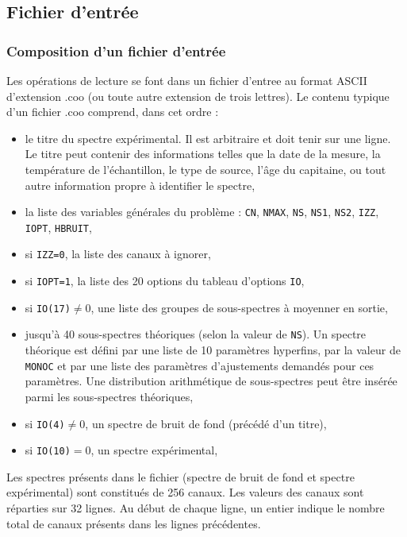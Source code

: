 \subsection{Fichier d'entrée}
\label{part:fichier_entree}
\subsubsection{Composition d'un fichier d'entrée}
Les opérations de lecture se font dans un fichier d'entree au format ASCII d'extension .coo (ou toute autre extension de trois lettres).
Le contenu typique d'un fichier .coo comprend, dans cet ordre :

\begin{itemize}
\item le titre du spectre expérimental. Il est arbitraire et doit tenir sur une ligne.
    Le titre peut contenir des informations telles que la date de la mesure, la température de l'échantillon, le type de source, l'âge du capitaine, ou tout autre information propre à identifier le spectre,
\item la liste des variables générales du problème : \lstinline{CN}, \lstinline{NMAX}, \lstinline{NS}, \lstinline{NS1}, \lstinline{NS2}, \lstinline{IZZ}, \lstinline{IOPT}, \lstinline{HBRUIT},
\item si \lstinline{IZZ=0}, la liste des canaux à ignorer,
\item si \lstinline{IOPT=1}, la liste des 20 options du tableau d'options \lstinline{IO},
\item si \lstinline{IO(17)}$\neq 0$, une liste des groupes de sous-spectres à moyenner en sortie,
\item jusqu'à 40 sous-spectres théoriques (selon la valeur de \lstinline{NS}).
Un spectre théorique est défini par une liste de 10 paramètres hyperfins, par la valeur de \lstinline{MONOC} et par une liste des paramètres d'ajustements demandés pour ces paramètres.
    Une distribution arithmétique de sous-spectres peut être insérée parmi les sous-spectres théoriques,
\item si \lstinline{IO(4)}$\neq 0 $, un spectre de bruit de fond (précédé d'un titre),
\item si \lstinline{IO(10)}$=0$, un spectre expérimental,
\end{itemize}
Les spectres présents dans le fichier (spectre de bruit de fond et spectre expérimental) sont constitués de 256 canaux.
Les valeurs des canaux sont réparties sur 32 lignes.
 Au début de chaque ligne, un entier indique le nombre total de canaux présents dans les lignes précédentes. 


